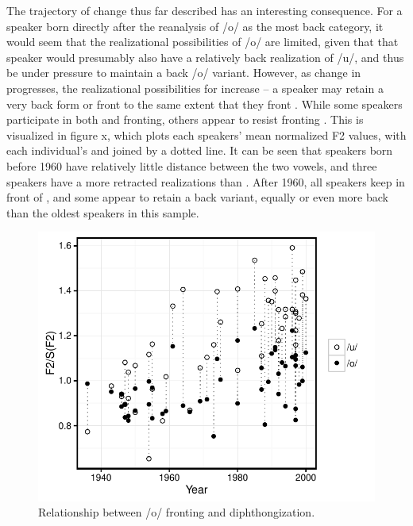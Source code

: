 \documentclass[12pt]{article}
\begin{document}
The trajectory of change thus far described has an interesting consequence. For a speaker born directly after the reanalysis of /o/ as the most back category, it would seem that the realizational possibilities of /o/ are limited, given that that speaker would presumably also have a relatively back realization of /u/, and thus be under pressure to maintain a back /o/ variant. However, as change in  progresses, the realizational possibilities for  increase -- a speaker may retain a very back form or front  to the same extent that they front . While some speakers participate in both  and  fronting, others appear to resist fronting . This is visualized in figure x, which plots each speakers' mean normalized F2 values, with each individual's  and  joined by a dotted line. It can be seen that speakers born before 1960 have relatively little distance between the two vowels, and three speakers have a more retracted  realizations than . After 1960, all speakers keep  in front of , and some appear to retain a back  variant, equally or even more back than the oldest speakers in this sample.

\vspace*{6pt}
\begin{figure}[H]
\centering
\includegraphics[scale=.7]{resistance1.pdf}
\caption{Relationship between /o/ fronting and diphthongization.}
\end{figure}
\vspace*{6pt}
\end{document}

